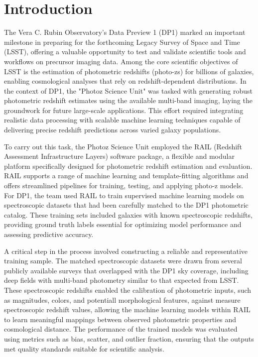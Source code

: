 \section{Introduction}
\label{sec:intro:0}

The Vera C. Rubin Observatory’s Data Preview 1 (DP1) marked an important milestone in preparing for the forthcoming Legacy Survey of Space and Time (LSST), offering a valuable opportunity to test and validate scientific tools and workflows on precursor imaging data. Among the core scientific objectives of LSST is the estimation of photometric redshifts (photo-zs) for billions of galaxies, enabling cosmological analyses that rely on redshift-dependent distributions. In the context of DP1, the "Photoz Science Unit" was tasked with generating robust photometric redshift estimates using the available multi-band imaging, laying the groundwork for future large-scale applications. This effort required integrating realistic data processing with scalable machine learning techniques capable of delivering precise redshift predictions across varied galaxy populations.

To carry out this task, the Photoz Science Unit employed the RAIL (Redshift Assessment Infrastructure Layers) software package, a flexible and modular platform specifically designed for photometric redshift estimation and evaluation. RAIL supports a range of machine learning and template-fitting algorithms and offers streamlined pipelines for training, testing, and applying photo-z models. For DP1, the team used RAIL to train supervised machine learning models on spectroscopic datasets that had been carefully matched to the DP1 photometric catalog. These training sets included galaxies with known spectroscopic redshifts, providing ground truth labels essential for optimizing model performance and assessing predictive accuracy.

A critical step in the process involved constructing a reliable and representative training sample. The matched spectroscopic datasets were drawn from several publicly available surveys that overlapped with the DP1 sky coverage, including deep fields with multi-band photometry similar to that expected from LSST. These spectroscopic redshifts enabled the calibration of photometric inputs, such as magnitudes, colors, and potentiall morphological features, against measure spectroscopic redshift values, allowing the machine learning models within RAIL to learn meaningful mappings between observed photometric properties and cosmological distance.  The performance of the trained models was evaluated using metrics such as bias, scatter, and outlier fraction, ensuring that the outputs met quality standards suitable for scientific analysis.

